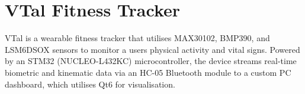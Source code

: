 \chapter{VTal Fitness Tracker }
\hypertarget{md__r_e_a_d_m_e}{}\label{md__r_e_a_d_m_e}
\label{md__r_e_a_d_m_e_autotoc_md0}%
%


VTal is a wearable fitness tracker that utilises MAX30102, BMP390, and LSM6\+DSOX sensors to monitor a user\textquotesingle{}s physical activity and vital signs. Powered by an STM32 (NUCLEO-\/\+L432\+KC) microcontroller, the device streams real-\/time biometric and kinematic data via an HC-\/05 Bluetooth module to a custom PC dashboard, which utilises Qt6 for visualisation. 